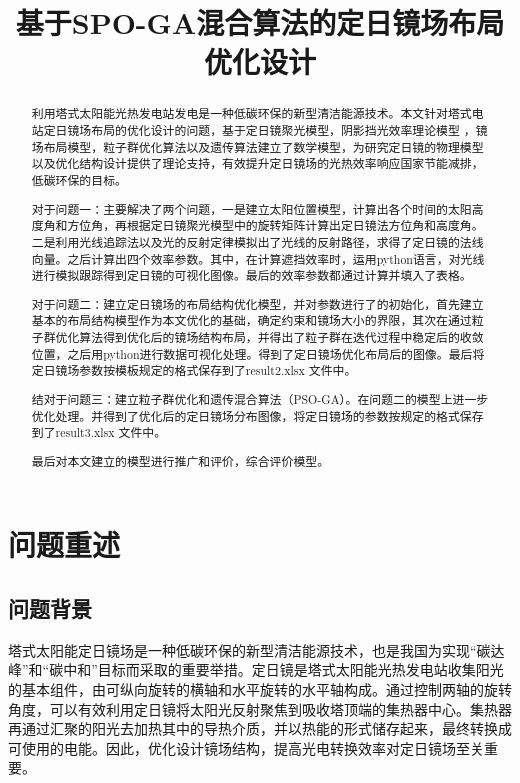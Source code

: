 \documentclass[withoutpreface,bwprint]{cumcmthesis} %
\title{基于SPO-GA混合算法的定日镜场布局优化设计}
\begin{document}
\maketitle

\begin{abstract}
    利用塔式太阳能光热发电站发电是一种低碳环保的新型清洁能源技术。本文针对塔式电站定日镜场布局的优化设计的问题，基于定日镜聚光模型，阴影挡光效率理论模型 ，镜场布局模型，粒子群优化算法以及遗传算法建立了数学模型，为研究定日镜的物理模型以及优化结构设计提供了理论支持，有效提升定日镜场的光热效率响应国家节能减排，低碳环保的目标。

    对于问题一：主要解决了两个问题，一是建立太阳位置模型，计算出各个时间的太阳高度角和方位角，再根据定日镜聚光模型中的旋转矩阵计算出定日镜法方位角和高度角。二是利用光线追踪法以及光的反射定律模拟出了光线的反射路径，求得了定日镜的法线向量。之后计算出四个效率参数。其中，在计算遮挡效率时，运用python语言，对光线进行模拟跟踪得到定日镜的可视化图像。最后的效率参数都通过计算并填入了表格。
    
    对于问题二：建立定日镜场的布局结构优化模型，并对参数进行了的初始化，首先建立基本的布局结构模型作为本文优化的基础，确定约束和镜场大小的界限，其次在通过粒子群优化算法得到优化后的镜场结构布局，并得出了粒子群在迭代过程中稳定后的收敛位置，之后用python进行数据可视化处理。得到了定日镜场优化布局后的图像。最后将定日镜场参数按模板规定的格式保存到了result2.xlsx 文件中。

    结对于问题三：建立粒子群优化和遗传混合算法（PSO-GA）。在问题二的模型上进一步优化处理。并得到了优化后的定日镜场分布图像，将定日镜场的参数按规定的格式保存到了result3.xlsx 文件中。
    
    最后对本文建立的模型进行推广和评价，综合评价模型。

\end{abstract}

\section{问题重述}

\subsection{问题背景}

塔式太阳能定日镜场是一种低碳环保的新型清洁能源技术\cite{许利华2020}，也是我国为实现“碳达峰”和“碳中和”目标而采取的重要举措。定日镜是塔式太阳能光热发电站收集阳光的基本组件，由可纵向旋转的横轴和水平旋转的水平轴构成。通过控制两轴的旋转角度，可以有效利用定日镜将太阳光反射聚焦到吸收塔顶端的集热器中心。集热器再通过汇聚的阳光去加热其中的导热介质，并以热能的形式储存起来，最终转换成可使用的电能。因此，优化设计镜场结构，提高光电转换效率对定日镜场至关重要。
\end{document}
